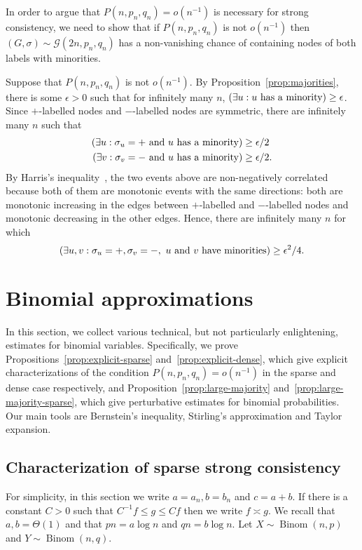 \documentclass[EJP]{ejpecp}
\newcommand{\1}[1]{\mathbbm{1}_{\{#1\}}}
\newcommand{\calG}{\mathcal{G}}
\let\Pr\relax
\DeclareMathOperator{\Pr}{Pr}
\DeclareMathOperator{\Binom}{Binom}
\begin{document}
In order to argue that $P(n, p_n, q_n) = o(n^{-1})$ is necessary
for strong consistency, we need to show that if
$P(n, p_n, q_n)$ is not $o(n^{-1})$ then $(G, \sigma) \sim \calG(2n, p_n, q_n)$
has a non-vanishing chance of containing nodes of both labels with minorities.

Suppose that $P(n, p_n, q_n)$ is not $o(n^{-1})$. By
Proposition~\ref{prop:majorities}, there is some $\epsilon > 0$ such
that for infinitely many $n$,
$\Pr(\exists u: \text{$u$ has a minority}) \ge \epsilon$. Since $+$-labelled
nodes and $-$-labelled nodes are symmetric, there are infinitely many $n$
such that
\begin{align*}
\Pr(\exists u: \sigma_u = + \text{ and $u$ has a minority}) &\ge \epsilon / 2 \\
\Pr(\exists v: \sigma_v = - \text{ and $u$ has a minority}) &\ge \epsilon / 2.
\end{align*}
By Harris's inequality~\cite{Harris:60},
the two events above are non-negatively correlated because both
of them are monotonic events with the same directions: both are monotonic
increasing in the edges between $+$-labelled and
$-$-labelled nodes and monotonic decreasing in the other edges.
Hence, there are infinitely many $n$ for which
\[
\Pr(\exists u, v: \sigma_u = +, \sigma_v = -, \text{ $u$ and $v$ have minorities})
\ge \epsilon^2 / 4.
\]

\section{Binomial approximations}\label{sec:binomial}

In this section, we collect various technical, but not particularly
enlightening, estimates for binomial variables.
Specifically, we prove Propositions~\ref{prop:explicit-sparse}
and~\ref{prop:explicit-dense}, which give explicit characterizations
of the condition $P(n, p_n, q_n) = o(n^{-1})$ in the sparse and dense case respectively,
and Proposition~\ref{prop:large-majority} and~\ref{prop:large-majority-sparse},
which give perturbative estimates for binomial probabilities.
Our main tools are
Bernstein's inequality, Stirling's approximation and Taylor expansion.

\subsection{Characterization of sparse strong consistency}

For simplicity, in this section we write $a = a_n, b = b_n$ and $c = a + b$.
If there is a constant $C > 0$ such that $C^{-1} f \le g \le C f$ then we
write $f \asymp g$. We recall that $a, b = \Theta(1)$ and that $p n = a \log n$
and $q n = b \log n$.
Let $X \sim \Binom(n, p)$ and $Y \sim \Binom(n, q)$.
\end{document}

